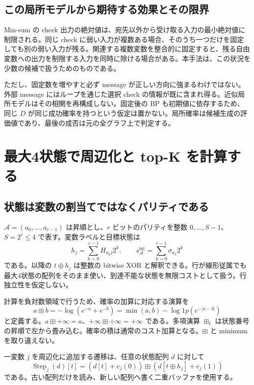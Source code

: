 \documentclass[a4paper,11pt]{ltjsarticle}
\numberwithin{equation}{section}
\theoremstyle{definition}
\newcommand{\A}{\mathcal A}
\newcommand{\ninf}{+\infty}
\begin{document}
\subsection{この局所モデルから期待する効果とその限界}
Min-sum の check 出力の絶対値は、宛先以外から受け取る入力の最小絶対値に制限される\cite{beam}。同じ check に弱い入力が複数ある場合、そのうち一つだけを固定しても別の弱い入力が残る。関連する複数変数を整合的に固定すると、残る自由変数への出力を制限する入力を同時に除ける場合がある。本手法は、この状況を少数の候補で扱うためのものである。

ただし、固定数を増やすと必ず message が正しい方向に強まるわけではない。外部 message にはループを通じた選択 check の情報が既に含まれ得る。近似局所モデルはその相関を再構成しない。固定後の BP も初期値に依存するため、同じ $D$ が同じ成功確率を持つという仮定は置かない。局所確率は候補生成の評価値であり、最後の成否は元の全グラフ上で判定する。

\section{最大4状態で周辺化と top-K を計算する}
\subsection{状態は変数の割当てではなくパリティである}
$\A=(a_0,\ldots,a_{r-1})$ は昇順とし、$r$ ビットのパリティを整数 $0,\ldots,S-1$、$S=2^r\le4$ で表す。変数ラベルと目標状態は
\begin{equation}
 h_j=\sum_{k=0}^{r-1}H_{a_kj}2^k,
 \qquad s_\A^{\mathrm{int}}=\sum_{k=0}^{r-1}\sigma_{a_k}2^k
 \label{eq:labels}
\end{equation}
である。以降の $t\oplus h_j$ は整数の bitwise XOR と解釈できる。行が線形従属でも最大4状態の配列をそのまま使い、到達不能な状態を無限コストとして扱う。行独立性を仮定しない。

計算を負対数領域で行うため、確率の加算に対応する演算を
\begin{equation}
 a\boxplus b=-\log(e^{-a}+e^{-b})
 =\min(a,b)-\log1p(e^{-|a-b|})
 \label{eq:logplus}
\end{equation}
と定義する。$a\boxplus\ninf=a$、$\ninf\boxplus\ninf=\ninf$ である。多項演算 $\mathop{\boxplus}_t$ は状態番号の昇順で左から畳み込む。確率の積は通常のコスト加算となる。$\boxplus$ と minimum を取り違えない。

一変数 $j$ を周辺化に追加する遷移は、任意の状態配列 $d$ に対して
\begin{equation}
 \operatorname{Step}_j(d)[t]
   =(d[t]+e_j(0))\boxplus(d[t\oplus h_j]+e_j(1))
 \label{eq:sum-transition}
\end{equation}
である。古い配列だけを読み、新しい配列へ書く二重バッファを使用する。
\end{document}
